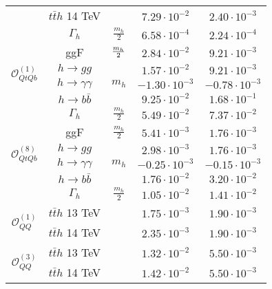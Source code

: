 \begin{table}[t!]
{\begin{tabular}{c||cccc}
            	                                                   	&   $t\bar t h$  {\color{Mahogany}  14 TeV }& & $7.29\cdot 10^{-2}$&  $2.40\cdot 10^{-3}$\\	           
            	                                                   &  $\Gamma_h$  & $\frac{m_h}{ 2}$ & $6.58 \cdot 10^{-4}$ &  $2.24 \cdot 10^{-4}$ \\   
                       	                                                   	\midrule
           \multirow{4}{*}{ { \normalsize$\mathcal{O}_{QtQb}^{(1)}$} } & ggF& ${m_h\over 2}$&$2.84\cdot 10^{-2}$&$9.21\cdot 10^{-3}$\\   %
            &  $h \to gg$& \multirow{3}{*}{$m_h$}&$ 1.57\cdot 10^{-2}$&$ 9.21\cdot 10^{-3}$\\
           &  $h \to \gamma \gamma$& &$-1.30\cdot 10^{-3}$&$-0.78\cdot 10^{-3}$\\
           &  $h \to b \bar b$& &$9.25\cdot 10^{-2}$&$1.68\cdot 10^{-1}$\\
           &  $\Gamma_h$  & $\frac{m_h}{ 2}$ & $5.49 \cdot 10^{-2}$ &  $7.37 \cdot 10^{-2}$ \\   
			\midrule
			 \multirow{4}{*}{{ \normalsize$\mathcal{O}_{QtQb}^{(8)}$}}  & ggF& {$\frac{m_h}{ 2}$}&$5.41\cdot 10^{-3}$&$1.76\cdot 10^{-3}$\\      %
			 & $h \to gg$& \multirow{3}{*}{$m_h$}&$2.98\cdot 10^{-3}$&$1.76\cdot 10^{-3}$\\
			&  $h \to \gamma \gamma$& &$-0.25\cdot 10^{-3}$& $-0.15\cdot 10^{-3}$\\
			&  $h \to b \bar b$& &$1.76\cdot 10^{-2}$&$3.20\cdot 10^{-2}$\\
			  &  $\Gamma_h$  & $\frac{m_h}{ 2}$ & $1.05 \cdot 10^{-2}$ &  $1.41 \cdot 10^{-2}$ \\   
			\midrule	    	 
			 \multirow{2}{*}{{ \normalsize$\mathcal{O}_{QQ}^{(1)}$}  }
			 	&  $t\bar t h$ {\color{Mahogany}  13 TeV }& \mr{$m_t+\frac{m_h}{ 2}$}&  {$1.75\cdot 10^{-3}$} &$1.90\cdot 10^{-3}$\\	    
			 &   $t\bar t h$  {\color{Mahogany}  14 TeV }& & $2.35\cdot 10^{-3}$& $1.90\cdot 10^{-3}$\\          
			 \midrule	    	 
			 \multirow{2}{*}{{ \normalsize$\mathcal{O}_{QQ}^{(3)}$}  }
			 &  $t\bar t h$ {\color{Mahogany}  13 TeV }& \mr{$m_t+\frac{m_h}{ 2}$}&  {$1.32\cdot 10^{-2}$} & $5.50\cdot 10^{-3}$\\	    
			 &   $t\bar t h$  {\color{Mahogany}  14 TeV }& & $1.42\cdot 10^{-2}$& $5.50\cdot 10^{-3}$\\        

\end{tabular}}
\end{table}
